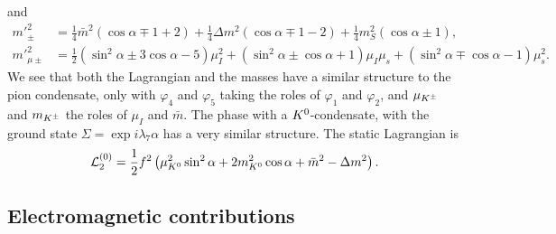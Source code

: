 \endgroup
%
and
%
\begingroup
\allowdisplaybreaks
\begin{align}
    {m'}_\pm^2
    & =
    \frac{1}{4}\bar m^2 (\cos\alpha \mp 1 + 2)
    + \frac{1}{4} \Delta m^2 (\cos\alpha \mp 1-2)
    +\frac{1}{4} m_S^2 (\cos\alpha \pm 1), \\
    {m'}_{\mu\pm}^2
    & =
    \frac{1}{2}(\sin^2\alpha  \pm 3\cos\alpha - 5)\mu_I^2
    +(\sin^2\alpha\pm\cos\alpha + 1)\mu_I\mu_s
    +(\sin^2\alpha\mp\cos\alpha - 1)\mu_s^2.
\end{align}
\endgroup
%
We see that both the Lagrangian and the masses have a similar structure to the pion condensate, only with $\varphi_4$ and $\varphi_5$ taking the roles of $\varphi_1$ and $\varphi_2$, and $\mu_{K^\pm}$ and $m_{K^\pm}$ the roles of $\mu_I$ and $\bar m$.
The phase with a ${K^0}$-condensate, with the ground state $\Sigma = \exp{i \lambda_7 \alpha}$ has a very similar structure.
The static Lagrangian is
%
\begin{equation}
    \label{static lagrangian neutral kaon}
    \mathcal{L}_2^{(0)} = \frac{1}{2}f^2 
    \left(
        \mu_{K^0}^2 \sin^2\alpha
        + 2m_{K^0}^2\cos\alpha + \bar m^2 - \Delta m^2
    \right).
\end{equation}
%

 
\subsection{Electromagnetic contributions}

